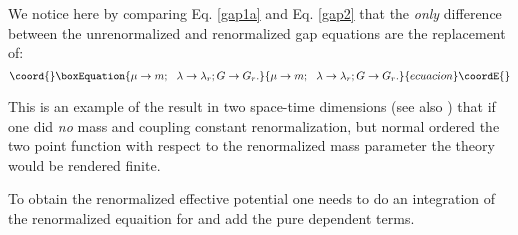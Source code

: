 \documentclass[a4paper,prd,preprint,superscriptaddress,showpacs,byrevtex]{revtex4}
\begin{document}
We notice here by comparing Eq. \ref{gap1a} and Eq. \ref{gap2} that the
{\em only} difference between the unrenormalized and renormalized gap
equations
are the replacement of:
\begin{equation}\coord{}\boxEquation{
\mu \rightarrow m; ~~ \lambda \rightarrow \lambda_r;  G \rightarrow G_r.
}{
\mu \rightarrow m; ~~ \lambda \rightarrow \lambda_r;  G \rightarrow G_r.
}{ecuacion}\coordE{}\end{equation}

This is an example of the result in two space-time dimensions (see also
\cite{ref:chang}) that if one did {\em no} mass and coupling constant
renormalization, but normal ordered the two point function with respect to the
renormalized mass parameter \coordHE{} the theory would be rendered finite.

To obtain the renormalized effective potential one needs to do an
integration of the renormalized equaition for \coordHE{} and add  the pure \myHighlight{$\phi$}\coordHE{} dependent terms.
\end{document}

